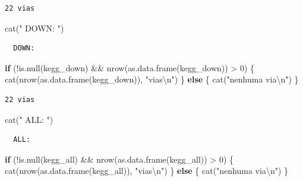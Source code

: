 \documentclass[
  letterpaper,
  DIV=11,
  numbers=noendperiod]{scrreprt}
\newenvironment{Shaded}{\begin{snugshade}}{\end{snugshade}}
\newcommand{\ControlFlowTok}[1]{\textcolor[rgb]{0.00,0.23,0.31}{\textbf{#1}}}
\newcommand{\DecValTok}[1]{\textcolor[rgb]{0.68,0.00,0.00}{#1}}
\newcommand{\FunctionTok}[1]{\textcolor[rgb]{0.28,0.35,0.67}{#1}}
\newcommand{\NormalTok}[1]{\textcolor[rgb]{0.00,0.23,0.31}{#1}}
\newcommand{\SpecialCharTok}[1]{\textcolor[rgb]{0.37,0.37,0.37}{#1}}
\newcommand{\StringTok}[1]{\textcolor[rgb]{0.13,0.47,0.30}{#1}}
\begin{document}
\begin{verbatim}
22 vias
\end{verbatim}

\begin{Shaded}
\begin{Highlighting}[]
\FunctionTok{cat}\NormalTok{(}\StringTok{"  DOWN: "}\NormalTok{)}
\end{Highlighting}
\end{Shaded}

\begin{verbatim}
  DOWN: 
\end{verbatim}

\begin{Shaded}
\begin{Highlighting}[]
\ControlFlowTok{if}\NormalTok{ (}\SpecialCharTok{!}\FunctionTok{is.null}\NormalTok{(kegg\_down) }\SpecialCharTok{\&\&} \FunctionTok{nrow}\NormalTok{(}\FunctionTok{as.data.frame}\NormalTok{(kegg\_down)) }\SpecialCharTok{\textgreater{}} \DecValTok{0}\NormalTok{) \{}
  \FunctionTok{cat}\NormalTok{(}\FunctionTok{nrow}\NormalTok{(}\FunctionTok{as.data.frame}\NormalTok{(kegg\_down)), }\StringTok{"vias}\SpecialCharTok{\textbackslash{}n}\StringTok{"}\NormalTok{)}
\NormalTok{\} }\ControlFlowTok{else}\NormalTok{ \{ }\FunctionTok{cat}\NormalTok{(}\StringTok{"nenhuma via}\SpecialCharTok{\textbackslash{}n}\StringTok{"}\NormalTok{) \}}
\end{Highlighting}
\end{Shaded}

\begin{verbatim}
22 vias
\end{verbatim}

\begin{Shaded}
\begin{Highlighting}[]
\FunctionTok{cat}\NormalTok{(}\StringTok{"  ALL:  "}\NormalTok{)}
\end{Highlighting}
\end{Shaded}

\begin{verbatim}
  ALL:  
\end{verbatim}

\begin{Shaded}
\begin{Highlighting}[]
\ControlFlowTok{if}\NormalTok{ (}\SpecialCharTok{!}\FunctionTok{is.null}\NormalTok{(kegg\_all) }\SpecialCharTok{\&\&} \FunctionTok{nrow}\NormalTok{(}\FunctionTok{as.data.frame}\NormalTok{(kegg\_all)) }\SpecialCharTok{\textgreater{}} \DecValTok{0}\NormalTok{) \{}
  \FunctionTok{cat}\NormalTok{(}\FunctionTok{nrow}\NormalTok{(}\FunctionTok{as.data.frame}\NormalTok{(kegg\_all)), }\StringTok{"vias}\SpecialCharTok{\textbackslash{}n}\StringTok{"}\NormalTok{)}
\NormalTok{\} }\ControlFlowTok{else}\NormalTok{ \{ }\FunctionTok{cat}\NormalTok{(}\StringTok{"nenhuma via}\SpecialCharTok{\textbackslash{}n}\StringTok{"}\NormalTok{) \}}
\end{Highlighting}
\end{Shaded}
\end{document}
